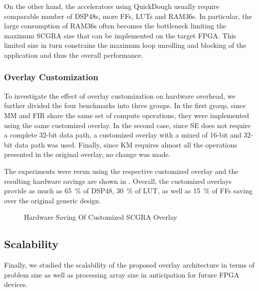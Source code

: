 On the other hand, the accelerators using QuickDough usually require comparable number of DSP48s, more FFs, LUTs and RAM36s.  In particular, the large consumption of RAM36s often becomes the bottleneck limiting the maximum SCGRA size that can be implemented on the target FPGA.
This limited size in turn constrains the maximum loop unrolling and blocking of the application and thus the overall performance.

\subsubsection{Overlay Customization}
To investigate the effect of overlay customization on hardware overhead, we further divided the four
benchmarks into three groups.  In the first group, since MM and FIR share the same set of compute
operations, they were implemented using the same customized overlay.  In the second case, since SE
does not require a complete \num{32}-bit data path, a customized overlay with a mixed of
\num{16}-bit and \num{32}-bit data path was used.  Finally, since KM requires almost all the operations presented in the original overlay, no change was made.

The experiments were rerun using the respective customized overlay and the resulting hardware savings are shown in .  Overall, the customized overlays provide as much as \SI{65}{\percent} of DSP48, \SI{30}{\percent} of LUT, as well as \SI{15}{\percent} of FFs saving over the original generic design.

\begin{figure}
\caption{Hardware Saving Of Customized SCGRA Overlay}
\label{fig:hardware-saving}
\end{figure}


  
\subsection{Scalability} \label{subsec:scalability}
Finally, we studied the scalability of the proposed overlay architecture in terms of problem size as
well as processing array size in anticipation for future FPGA devices.

